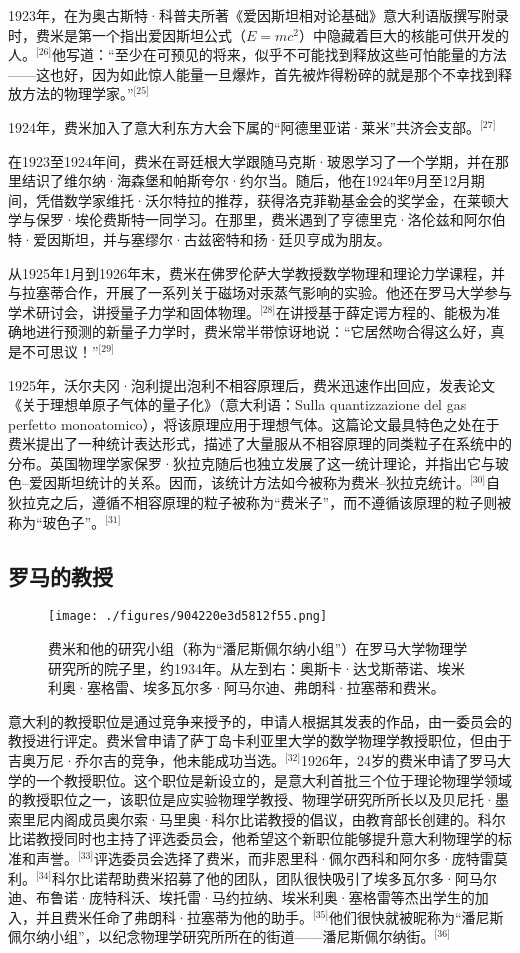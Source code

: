1923年，在为奥古斯特·科普夫所著《爱因斯坦相对论基础》意大利语版撰写附录时，费米是第一个指出爱因斯坦公式（$E = mc^2$）中隐藏着巨大的核能可供开发的人。\(^\text{[26]}\)他写道：“至少在可预见的将来，似乎不可能找到释放这些可怕能量的方法——这也好，因为如此惊人能量一旦爆炸，首先被炸得粉碎的就是那个不幸找到释放方法的物理学家。”\(^\text{[25]}\)

1924年，费米加入了意大利东方大会下属的“阿德里亚诺·莱米”共济会支部。\(^\text{[27]}\)

在1923至1924年间，费米在哥廷根大学跟随马克斯·玻恩学习了一个学期，并在那里结识了维尔纳·海森堡和帕斯夸尔·约尔当。随后，他在1924年9月至12月期间，凭借数学家维托·沃尔特拉的推荐，获得洛克菲勒基金会的奖学金，在莱顿大学与保罗·埃伦费斯特一同学习。在那里，费米遇到了亨德里克·洛伦兹和阿尔伯特·爱因斯坦，并与塞缪尔·古兹密特和扬·廷贝亨成为朋友。

从1925年1月到1926年末，费米在佛罗伦萨大学教授数学物理和理论力学课程，并与拉塞蒂合作，开展了一系列关于磁场对汞蒸气影响的实验。他还在罗马大学参与学术研讨会，讲授量子力学和固体物理。\(^\text{[28]}\)在讲授基于薛定谔方程的、能极为准确地进行预测的新量子力学时，费米常半带惊讶地说：“它居然吻合得这么好，真是不可思议！”\(^\text{[29]}\)

1925年，沃尔夫冈·泡利提出泡利不相容原理后，费米迅速作出回应，发表论文《关于理想单原子气体的量子化》（意大利语：Sulla quantizzazione del gas perfetto monoatomico），将该原理应用于理想气体。这篇论文最具特色之处在于费米提出了一种统计表达形式，描述了大量服从不相容原理的同类粒子在系统中的分布。英国物理学家保罗·狄拉克随后也独立发展了这一统计理论，并指出它与玻色–爱因斯坦统计的关系。因而，该统计方法如今被称为费米–狄拉克统计。\(^\text{[30]}\)自狄拉克之后，遵循不相容原理的粒子被称为“费米子”，而不遵循该原理的粒子则被称为“玻色子”。\(^\text{[31]}\)
\subsection{罗马的教授}
\begin{figure}[ht]
\centering
\texttt{[image: ./figures/904220e3d5812f55.png]}
\caption{费米和他的研究小组（称为“潘尼斯佩尔纳小组”）在罗马大学物理学研究所的院子里，约1934年。从左到右：奥斯卡·达戈斯蒂诺、埃米利奥·塞格雷、埃多瓦尔多·阿马尔迪、弗朗科·拉塞蒂和费米。} \label{fig_ELK_4}
\end{figure}
意大利的教授职位是通过竞争来授予的，申请人根据其发表的作品，由一委员会的教授进行评定。费米曾申请了萨丁岛卡利亚里大学的数学物理学教授职位，但由于吉奥万尼·乔尔吉的竞争，他未能成功当选。\(^\text{[32]}\)1926年，24岁的费米申请了罗马大学的一个教授职位。这个职位是新设立的，是意大利首批三个位于理论物理学领域的教授职位之一，该职位是应实验物理学教授、物理学研究所所长以及贝尼托·墨索里尼内阁成员奥尔索·马里奥·科尔比诺教授的倡议，由教育部长创建的。科尔比诺教授同时也主持了评选委员会，他希望这个新职位能够提升意大利物理学的标准和声誉。\(^\text{[33]}\)评选委员会选择了费米，而非恩里科·佩尔西科和阿尔多·庞特雷莫利。\(^\text{[34]}\)科尔比诺帮助费米招募了他的团队，团队很快吸引了埃多瓦尔多·阿马尔迪、布鲁诺·庞特科沃、埃托雷·马约拉纳、埃米利奥·塞格雷等杰出学生的加入，并且费米任命了弗朗科·拉塞蒂为他的助手。\(^\text{[35]}\)他们很快就被昵称为“潘尼斯佩尔纳小组”，以纪念物理学研究所所在的街道——潘尼斯佩尔纳街。\(^\text{[36]}\)

